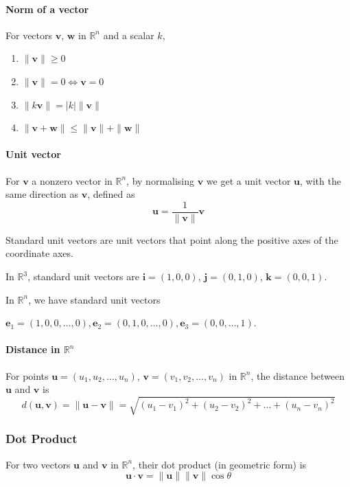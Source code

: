 \documentclass[../linear-algebra.tex]{subfiles}
\begin{document}
\paragraph{Norm of a vector}
For vectors $\mathbf{v}$, $\mathbf{w}$ in $\mathbb{R}^n$ and a scalar $k$,
\begin{enumerate}
    \item $\|\mathbf{v}\| \geq 0$
    \item $\|\mathbf{v}\| = 0 \iff \mathbf{v} = 0$
    \item $\|k\mathbf{v}\| = |k|\|\mathbf{v}\|$
    \item $\|\mathbf{v} + \mathbf{w}\| \leq \|\mathbf{v}\| + \|\mathbf{w}\|$
\end{enumerate}

\paragraph{Unit vector}
For $\mathbf{v}$ a nonzero vector in $\mathbb{R}^n$, by normalising $\mathbf{v}$
we get a unit vector $\mathbf{u}$, with the same direction as $\mathbf{v}$,
defined as
\[\mathbf{u} = \frac{1}{\|\mathbf{v}\|}\mathbf{v}\]

\noindent Standard unit vectors are unit vectors that point along the positive axes
of the coordinate axes.

\noindent In $\mathbb{R}^3$, standard unit vectors are $\mathbf{i} = (1, 0, 0)$, $\mathbf{j} = (0, 1, 0)$, $\mathbf{k} = (0, 0, 1)$.

\noindent In $\mathbb{R}^n$, we have standard unit vectors

$\mathbf{e}_1 = (1, 0, 0, \ldots, 0), \mathbf{e}_2 = (0, 1, 0, \ldots, 0), \mathbf{e}_3 = (0, 0, \ldots, 1)$.

\paragraph{Distance in $\mathbb{R}^n$}
For points $\mathbf{u} = (u_1, u_2, \ldots, u_n)$, $\mathbf{v} = (v_1, v_2, \ldots, v_n)$ in $\mathbb{R}^n$,
the distance between $\mathbf{u}$ and $\mathbf{v}$ is
\[d(\mathbf{u}, \mathbf{v}) = \|\mathbf{u} - \mathbf{v}\|
= \sqrt{(u_1 - v_1)^2 + (u_2 - v_2)^2 + \ldots + (u_n - v_n)^2}\]

\subsubsection*{Dot Product}

For two vectors $\mathbf{u}$ and $\mathbf{v}$ in $\mathbb{R}^n$, their dot product (in geometric form) is
\[\mathbf{u} \cdot \mathbf{v} = \|\mathbf{u}\|\|\mathbf{v}\|\cos\theta\]
\end{document}
